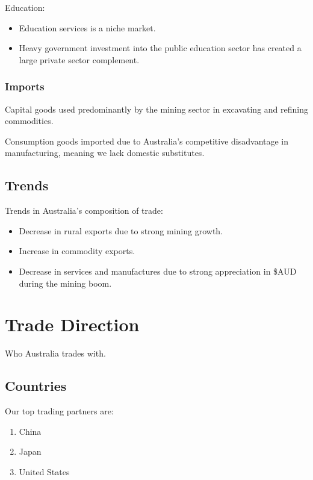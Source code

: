 \documentclass[a4paper,11pt]{article}
\begin{document}
Education:

\begin{itemize}
\item Education services is a niche market.
\item Heavy government investment into the public education sector has created
 	a large private sector complement.
\end{itemize}


\subsubsection{Imports}

Capital goods used predominantly by the mining sector in excavating and
refining commodities.

Consumption goods imported due to Australia's competitive disadvantage in
manufacturing, meaning we lack domestic substitutes.


\subsection{Trends}

Trends in Australia's composition of trade:

\begin{itemize}
\item Decrease in rural exports due to strong mining growth.
\item Increase in commodity exports.
\item Decrease in services and manufactures due to strong appreciation in \$AUD
	during the mining boom.
\end{itemize}




\section{Trade Direction}

Who Australia trades with.


\subsection{Countries}

Our top trading partners are:

\begin{enumerate}
\item China
\item Japan
\item United States
\end{enumerate}
\end{document}
